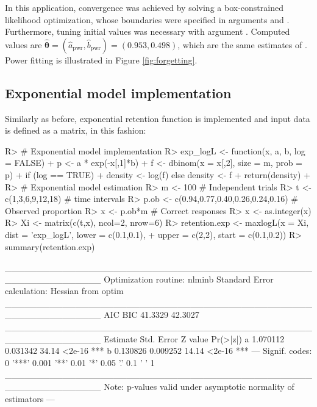 \documentclass[nojss]{jss}
\begin{document}
In this application, convergence was achieved by solving a box-constrained likelihood optimization, whose boundaries were specified in arguments  and . Furthermore, tuning initial values was necessary with argument . Computed values are $\hat{\boldsymbol{\theta}}=(\hat{a}_{\text{pwr}},\hat{b}_{\text{pwr}})=(0.953,0.498)$, which are the same estimates of \cite{Myung2003}. Power fitting is illustrated in Figure \ref{fig:forgetting}.

\subsection*{Exponential model implementation}

Similarly as before, exponential retention function is implemented and input data is defined as a matrix, in this fashion:

\begin{Schunk}
\begin{Sinput}
R> # Exponential model implementation
R> exp_logL <- function(x, a, b, log = FALSE){
+    p <- a * exp(-x[,1]*b)
+    f <- dbinom(x = x[,2], size = m, prob = p)
+    if (log == TRUE)
+      density <- log(f) else density <- f
+    return(density)
+  }
R> # Exponential model estimation
R> m <- 100 # Independent trials
R> t <- c(1,3,6,9,12,18) # time intervals
R> p.ob <- c(0.94,0.77,0.40,0.26,0.24,0.16) # Observed proportion
R> x <- p.ob*m # Correct responses
R> x <- as.integer(x)
R> Xi <- matrix(c(t,x), ncol=2, nrow=6)
R> retention.exp <- maxlogL(x = Xi, dist = 'exp_logL', lower = c(0.1,0.1),
+                           upper = c(2,2), start = c(0.1,0.2))
R> summary(retention.exp)
\end{Sinput}
\begin{Soutput}
_______________________________________________________________
Optimization routine: nlminb 
Standard Error calculation: Hessian from optim 
_______________________________________________________________
      AIC     BIC
  41.3329 42.3027
_______________________________________________________________
  Estimate  Std. Error Z value Pr(>|z|)    
a  1.070112   0.031342   34.14   <2e-16 ***
b  0.130826   0.009252   14.14   <2e-16 ***
---
Signif. codes:  0 '***' 0.001 '**' 0.01 '*' 0.05 '.' 0.1 ' ' 1
_______________________________________________________________
Note: p-values valid under asymptotic normality of estimators 
---
\end{Soutput}
\end{Schunk}
\end{document}
